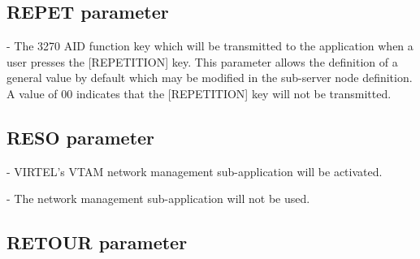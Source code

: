\documentclass[letterpaper,10pt,english]{sphinxmanual}
\begin{document}
\ignorespaces 

\subsection{REPET parameter}
\label{\detokenize{Installation_Guide:repet-parameter}}\label{\detokenize{Installation_Guide:index-107}}
\begin{sphinxVerbatim}[commandchars=\\\{\}]
  
\end{sphinxVerbatim}

 - The 3270 AID function key which will be transmitted to the application when a user presses the {[}REPETITION{]} key. This parameter allows the definition of a general value by default which may be modified in the sub-server node definition. A value of 00 indicates that the {[}REPETITION{]} key will not be transmitted.

\ignorespaces 

\subsection{RESO parameter}
\label{\detokenize{Installation_Guide:reso-parameter}}\label{\detokenize{Installation_Guide:index-108}}
\begin{sphinxVerbatim}[commandchars=\\\{\}]
 
\end{sphinxVerbatim}

 - VIRTEL’s VTAM network management sub-application will be activated.

 - The network management sub-application will not be used.

\ignorespaces 

\subsection{RETOUR parameter}
\label{\detokenize{Installation_Guide:retour-parameter}}\label{\detokenize{Installation_Guide:index-109}}
\begin{sphinxVerbatim}[commandchars=\\\{\}]
 
\end{sphinxVerbatim}
\end{document}
